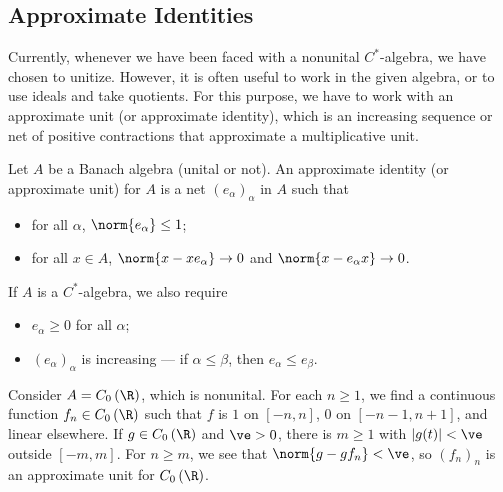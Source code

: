 \documentclass[10pt]{mypackage}
\begin{document}
\subsection{Approximate Identities}%
Currently, whenever we have been faced with a nonunital $C^{\ast}$-algebra, we have chosen to unitize. However, it is often useful to work in the given algebra, or to use ideals and take quotients. For this purpose, we have to work with an approximate unit (or approximate identity), which is an increasing sequence or net of positive contractions that approximate a multiplicative unit.
\begin{definition}
  Let $A$ be a Banach algebra (unital or not). An approximate identity (or approximate unit) for $A$ is a net $\left(e_{\alpha}\right)_{\alpha}$ in $A$ such that
  \begin{itemize}
    \item for all $\alpha$, $\norm{e_{\alpha}} \leq 1$;
    \item for all $x\in A$, $\norm{x - xe_{\alpha}}\rightarrow 0$ and $\norm{x - e_{\alpha}x}\rightarrow 0$.
  \end{itemize}
  If $A$ is a $C^{\ast}$-algebra, we also require
  \begin{itemize}
    \item $e_{\alpha}\geq 0$ for all $\alpha$;
    \item $\left(e_{\alpha}\right)_{\alpha}$ is increasing --- if $\alpha \leq \beta$, then $e_{\alpha}\leq e_{\beta}$.
  \end{itemize}
\end{definition}
\begin{example}
  Consider $A = C_0\left(\R\right)$, which is nonunital. For each $n\geq 1$, we find a continuous function $f_n\in C_0\left(\R\right)$ such that $f$ is $1$ on $\left[-n,n\right]$, $0$ on $\left[-n-1,n+1\right]$, and linear elsewhere. If $g\in C_0\left(\R\right)$ and $\ve > 0$, there is $m \geq 1$ with $\left\vert g(t) \right\vert < \ve$ outside $\left[-m,m\right]$. For $n\geq m$, we see that $\norm{g-gf_n} < \ve$, so $\left(f_n\right)_n$ is an approximate unit for $C_0\left(\R\right)$.
\end{example}
\end{document}
